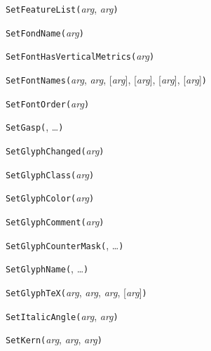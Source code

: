 
\noindent\texttt{SetFeatureList(}\textit{arg}, \textit{arg}\texttt{)}


\noindent\texttt{SetFondName(}\textit{arg}\texttt{)}


\noindent\texttt{SetFontHasVerticalMetrics(}\textit{arg}\texttt{)}


\noindent\texttt{SetFontNames(}\textit{arg}, \textit{arg}, [\textit{arg}], [\textit{arg}], [\textit{arg}], [\textit{arg}]\texttt{)}


\noindent\texttt{SetFontOrder(}\textit{arg}\texttt{)}


\noindent\texttt{SetGasp(}, \ldots\texttt{)}


\noindent\texttt{SetGlyphChanged(}\textit{arg}\texttt{)}


\noindent\texttt{SetGlyphClass(}\textit{arg}\texttt{)}


\noindent\texttt{SetGlyphColor(}\textit{arg}\texttt{)}


\noindent\texttt{SetGlyphComment(}\textit{arg}\texttt{)}


\noindent\texttt{SetGlyphCounterMask(}, \ldots\texttt{)}


\noindent\texttt{SetGlyphName(}, \ldots\texttt{)}


\noindent\texttt{SetGlyphTeX(}\textit{arg}, \textit{arg}, \textit{arg}, [\textit{arg}]\texttt{)}


\noindent\texttt{SetItalicAngle(}\textit{arg}, \textit{arg}\texttt{)}


\noindent\texttt{SetKern(}\textit{arg}, \textit{arg}, \textit{arg}\texttt{)}

